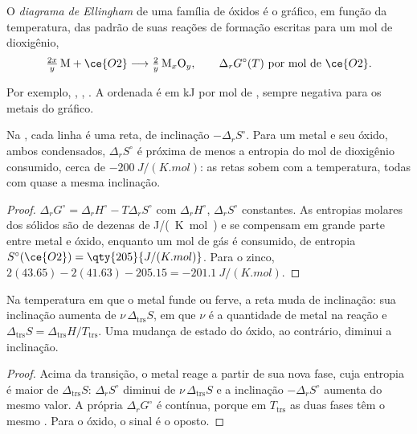 \begin{definition}\label{def:b2:ellingham:diagram}
O \emph{diagrama de Ellingham} de uma família de óxidos
é o gráfico, em função da temperatura, das  padrão de suas
reações de formação escritas para um mol de dioxigênio,
\[
  \tfrac{2x}{y}\,\mathrm M + \ce{O2} \longrightarrow \tfrac{2}{y}\,\mathrm{M}_x\mathrm O_y ,
  \qquad \Delta_r G^\circ(T) \ \text{por mol de } \ce{O2} .
\]
\end{definition}

Por exemplo, , , . A ordenada é em \unit{kJ} por mol de , sempre negativa para os
metais do gráfico.

\begin{proposition}[Retas]\label{prop:b2:ellingham:line}
Na , cada linha é uma reta, de inclinação $-\Delta_r
S^\circ$. Para um metal e seu óxido, ambos condensados, $\Delta_r S^\circ$ é
próxima de menos a entropia do mol de dioxigênio consumido, cerca de
$-\qty{200}{J/(K.mol)}$: as retas sobem com a temperatura, todas com quase a
mesma inclinação.
\end{proposition}

\begin{proof}
$\Delta_r G^\circ = \Delta_r H^\circ - T\Delta_r S^\circ$ com $\Delta_r
H^\circ$, $\Delta_r S^\circ$ constantes. As entropias molares dos sólidos são
de dezenas de \unit{J/(K.mol)} e se compensam em grande parte entre metal e
óxido, enquanto um mol de gás é consumido, de entropia
$S^\circ(\ce{O2}) = \qty{205}{J/(K.mol)}$. Para o zinco,
$2(43.65) - 2(41.63) - 205.15 = \qty{-201.1}{J/(K.mol)}$.
\end{proof}

\begin{proposition}\label{prop:b2:ellingham:break}
Na temperatura em que o metal funde ou ferve, a reta muda de inclinação:
sua inclinação aumenta de $\nu\,\Delta_{\text{trs}}S$, em que $\nu$ é a quantidade
de metal na reação e $\Delta_{\text{trs}}S = \Delta_{\text{trs}}H/T_{\text{trs}}$.
Uma mudança de estado do óxido, ao contrário, diminui a inclinação.
\end{proposition}

\begin{proof}
Acima da transição, o metal reage a partir de sua nova fase, cuja entropia é
maior de $\Delta_{\text{trs}}S$: $\Delta_r S^\circ$ diminui de $\nu\,\Delta_{\text{trs}}S$
e a inclinação $-\Delta_r S^\circ$ aumenta do mesmo valor. A própria
$\Delta_r G^\circ$ é contínua, porque em $T_{\text{trs}}$ as duas fases têm o
mesmo . Para o óxido, o sinal é o oposto.
\end{proof}

